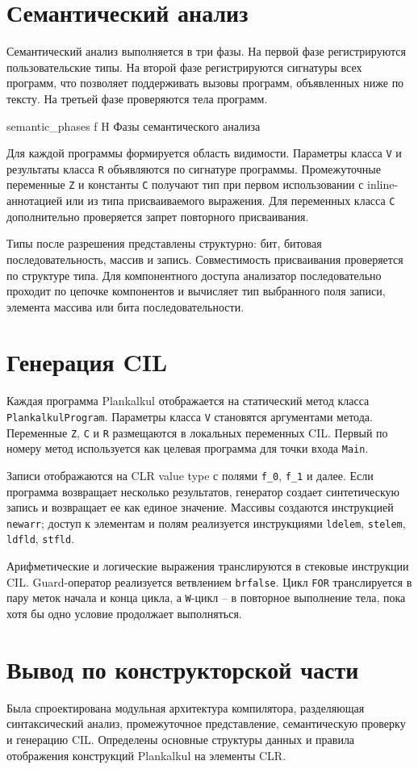 \section{Семантический анализ}
Семантический анализ выполняется в три фазы.
На первой фазе регистрируются пользовательские типы.
На второй фазе регистрируются сигнатуры всех программ, что позволяет поддерживать вызовы программ, объявленных ниже по тексту.
На третьей фазе проверяются тела программ.

	{semantic_phases}
	{f}
	{H}
	{\textwidth}
	{Фазы семантического анализа}

Для каждой программы формируется область видимости.
Параметры класса \texttt{V} и результаты класса \texttt{R} объявляются по сигнатуре программы.
Промежуточные переменные \texttt{Z} и константы \texttt{C} получают тип при первом использовании с inline-аннотацией или из типа присваиваемого выражения.
Для переменных класса \texttt{C} дополнительно проверяется запрет повторного присваивания.

Типы после разрешения представлены структурно: бит, битовая последовательность, массив и запись.
Совместимость присваивания проверяется по структуре типа.
Для компонентного доступа анализатор последовательно проходит по цепочке компонентов и вычисляет тип выбранного поля записи, элемента массива или бита последовательности.

\section{Генерация CIL}
Каждая программа Plankalkul отображается на статический метод класса \texttt{PlankalkulProgram}.
Параметры класса \texttt{V} становятся аргументами метода.
Переменные \texttt{Z}, \texttt{C} и \texttt{R} размещаются в локальных переменных CIL.
Первый по номеру метод используется как целевая программа для точки входа \texttt{Main}.

Записи отображаются на CLR value type с полями \texttt{f\_0}, \texttt{f\_1} и далее.
Если программа возвращает несколько результатов, генератор создает синтетическую запись и возвращает ее как единое значение.
Массивы создаются инструкцией \texttt{newarr}; доступ к элементам и полям реализуется инструкциями \texttt{ldelem}, \texttt{stelem}, \texttt{ldfld}, \texttt{stfld}.

Арифметические и логические выражения транслируются в стековые инструкции CIL.
Guard-оператор реализуется ветвлением \texttt{brfalse}.
Цикл \texttt{FOR} транслируется в пару меток начала и конца цикла, а \texttt{W}-цикл -- в повторное выполнение тела, пока хотя бы одно условие продолжает выполняться.

\section*{Вывод по конструкторской части}
Была спроектирована модульная архитектура компилятора, разделяющая синтаксический анализ, промежуточное представление, семантическую проверку и генерацию CIL.
Определены основные структуры данных и правила отображения конструкций Plankalkul на элементы CLR.

